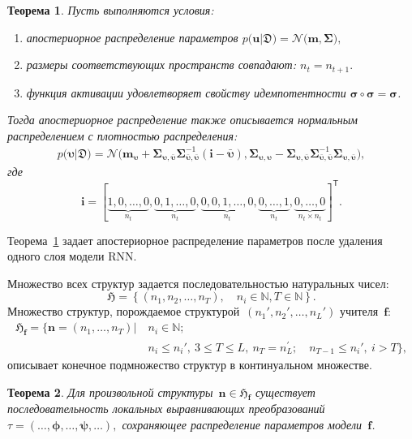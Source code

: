 \documentclass{dissert}
\newtheorem{theorem}{Теорема}
\begin{document}
\begin{theorem}
\label{ch-3:th:rnn:later}
Пусть выполняются условия:
\begin{enumerate}
\item[1)] апостериорное распределение параметров $p\bigr(\mathbf{u}|\mathfrak{D}\bigr) = \mathcal{N}\bigr(\mathbf{m}, \bm{\Sigma}\bigr),$
\item[2)] размеры соответствующих пространств совпадают: $n_t=n_{t+1}.$
\item[3)] функция активации удовлетворяет свойству идемпотентности $\bm{\sigma} \circ \bm{\sigma} = \bm{\sigma}$.
\end{enumerate}
Тогда апостериорное распределение также описывается нормальным распределением с плотностью распределения:
\[
\begin{aligned}
p\bigr(\bm{\upsilon}|\mathfrak{D}\bigr) = \mathcal{N}\bigr(\mathbf{m}_{\bm{\upsilon}}+\bm{\Sigma}_{\bm{\upsilon},\bar{\bm{\upsilon}}} \bm{\Sigma}_{\bar{\bm{\upsilon}},\bar{\bm{\upsilon}}}^{-1} \left(\mathbf{i} - \bar{\bm{\upsilon}}\right), \bm{\Sigma}_{\bm{\upsilon},\bm{\upsilon}} - \bm{\Sigma}_{\bm{\upsilon},\bar{\bm{\upsilon}}}\bm{\Sigma}_{\bar{\bm{\upsilon}},\bar{\bm{\upsilon}}}^{-1}\bm{\Sigma}_{\bm{\upsilon},\bar{\bm{\upsilon}}}\bigr),
\end{aligned}
\]
где
\[
\mathbf{i}=[\underbrace{1, 0, \ldots, 0}_{n_t}, \underbrace{0, 1, \ldots, 0}_{n_t}, \underbrace{0, 0, 1, \ldots, 0}_{n_t}, \underbrace{0, \ldots, 1}_{n_t}, \underbrace{0, \ldots, 0}_{n_t\times n_t}]^{\mathsf{T}}.
\]
\end{theorem}

Теорема~\ref{ch-3:th:rnn:later} задает апостериорное распределение параметров после удаления одного слоя модели RNN.

Множество всех структур задается последовательностью натуральных чисел:
\[
\mathfrak{H} = \left\{(n_1, n_2, \ldots, n_{T}), \quad n_i \in \mathbb{N}, T \in \mathbb{N}\right\}.
\]
Множество структур, порождаемое структурой~$(n_{1}', n_{2}', \ldots, n_{L}')$ учителя~$\mathbf{f}$:
\[
\begin{aligned}
    \mathfrak{H}_{\mathbf{f}} = \Big\{\mathbf{n} = \left(n_1, \ldots, n_{T}\right)|~&n_i \in \mathbb{N}; \\
    & n_i \leq n_{i}',~3\leq T\leq L,~n_{T}=n^{'}_{L}; \quad n_{T-1} \leq n_{i}',~i > T\Big\},
\end{aligned}
\]
описывает конечное подмножество структур в континуальном множестве.

\begin{theorem}
\label{th-9:visual}
Для произвольной структуры~$\mathbf{n} \in \mathfrak{H}_{\mathbf{f}}$ существует последовательность локальных выравнивающих преобразований $\tau = (\ldots, \bm{\phi}, \ldots, \bm{\psi}, \ldots),$ сохраняющее распределение параметров модели~$\mathbf{f}$.
\end{theorem}
\end{document}
